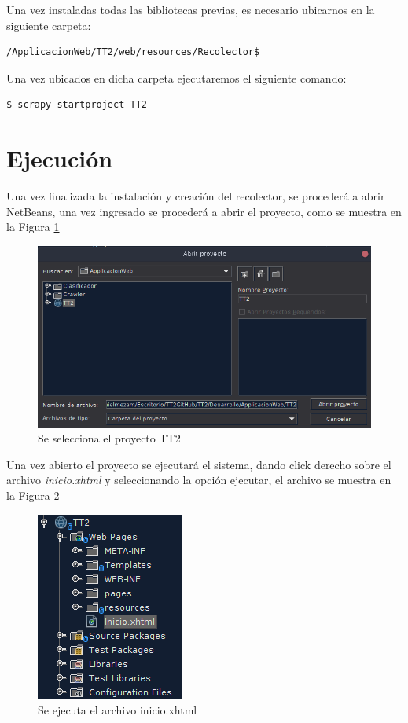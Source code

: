 	Una vez instaladas todas las bibliotecas previas, es necesario ubicarnos en la siguiente carpeta:
	\begin{lstlisting}[language=bash]
		/ApplicacionWeb/TT2/web/resources/Recolector$
	\end{lstlisting}
	Una vez ubicados en dicha carpeta ejecutaremos el siguiente comando:
	\begin{lstlisting}[language=bash]
		$ scrapy startproject TT2
	\end{lstlisting}
	
\section{Ejecución}
Una vez finalizada la instalación y creación del recolector, se procederá a abrir NetBeans, una vez ingresado se procederá a abrir el proyecto, como se muestra en la Figura \ref{fig:seleccionarProyecto}
\begin{figure}[H]
	\centering
	\includegraphics[scale=0.6]{imagenes/abrirProyecto.png}
	\caption{Se selecciona el proyecto TT2}
	\label{fig:seleccionarProyecto}
\end{figure}

Una vez abierto el proyecto se ejecutará el sistema, dando click derecho sobre el archivo \textit{inicio.xhtml} y seleccionando la opción ejecutar, el archivo se muestra en la Figura \ref{fig:inicio}

\begin{figure}[H]
	\centering
	\includegraphics[scale=0.6]{imagenes/ejecutar.png}
	\caption{Se ejecuta el archivo inicio.xhtml}
	\label{fig:inicio}
\end{figure}


